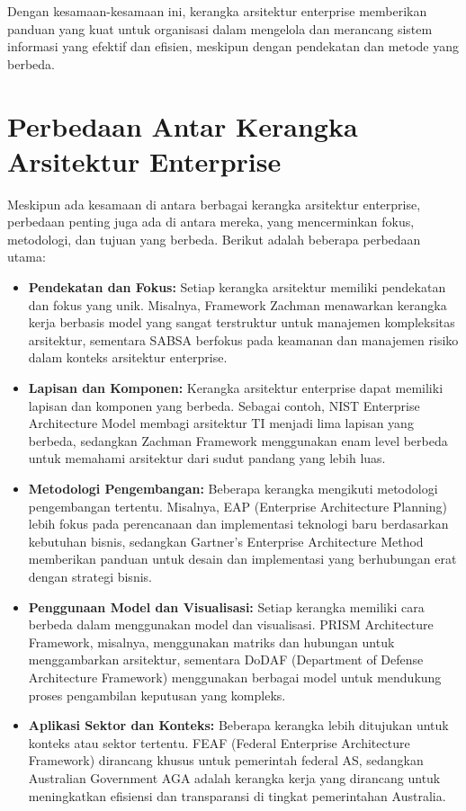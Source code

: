 Dengan kesamaan-kesamaan ini, kerangka arsitektur enterprise memberikan panduan yang kuat untuk organisasi dalam mengelola dan merancang sistem informasi yang efektif dan efisien, meskipun dengan pendekatan dan metode yang berbeda.

\section{Perbedaan Antar Kerangka Arsitektur Enterprise}
Meskipun ada kesamaan di antara berbagai kerangka arsitektur enterprise, perbedaan penting juga ada di antara mereka, yang mencerminkan fokus, metodologi, dan tujuan yang berbeda. Berikut adalah beberapa perbedaan utama:

\begin{itemize}
	\item \textbf{Pendekatan dan Fokus:} Setiap kerangka arsitektur memiliki pendekatan dan fokus yang unik. Misalnya, Framework Zachman menawarkan kerangka kerja berbasis model yang sangat terstruktur untuk manajemen kompleksitas arsitektur, sementara SABSA berfokus pada keamanan dan manajemen risiko dalam konteks arsitektur enterprise.
	
	\item \textbf{Lapisan dan Komponen:} Kerangka arsitektur enterprise dapat memiliki lapisan dan komponen yang berbeda. Sebagai contoh, NIST Enterprise Architecture Model membagi arsitektur TI menjadi lima lapisan yang berbeda, sedangkan Zachman Framework menggunakan enam level berbeda untuk memahami arsitektur dari sudut pandang yang lebih luas.
	
	\item \textbf{Metodologi Pengembangan:} Beberapa kerangka mengikuti metodologi pengembangan tertentu. Misalnya, EAP (Enterprise Architecture Planning) lebih fokus pada perencanaan dan implementasi teknologi baru berdasarkan kebutuhan bisnis, sedangkan Gartner's Enterprise Architecture Method memberikan panduan untuk desain dan implementasi yang berhubungan erat dengan strategi bisnis.
	
	\item \textbf{Penggunaan Model dan Visualisasi:} Setiap kerangka memiliki cara berbeda dalam menggunakan model dan visualisasi. PRISM Architecture Framework, misalnya, menggunakan matriks dan hubungan untuk menggambarkan arsitektur, sementara DoDAF (Department of Defense Architecture Framework) menggunakan berbagai model untuk mendukung proses pengambilan keputusan yang kompleks.
	
	\item \textbf{Aplikasi Sektor dan Konteks:} Beberapa kerangka lebih ditujukan untuk konteks atau sektor tertentu. FEAF (Federal Enterprise Architecture Framework) dirancang khusus untuk pemerintah federal AS, sedangkan Australian Government AGA adalah kerangka kerja yang dirancang untuk meningkatkan efisiensi dan transparansi di tingkat pemerintahan Australia.
	

\end{itemize}

